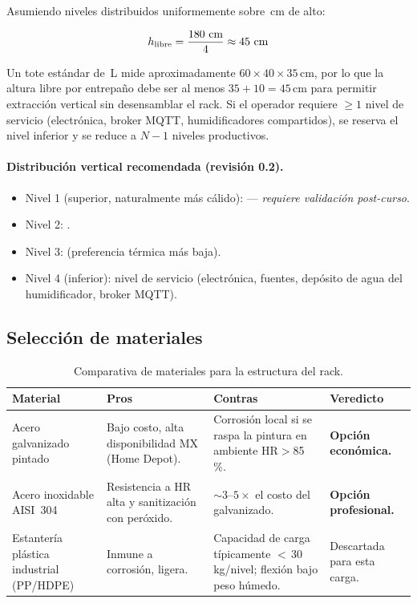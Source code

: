Asumiendo \paramNiveles{} niveles distribuidos uniformemente sobre
\paramHmax\,cm de alto:

\begin{equation}
  h_{\text{libre}} = \frac{\text{180}~\text{cm}}{\text{4}} \approx 45~\text{cm}
\end{equation}

Un tote estándar de \paramVolTote\,L mide aproximadamente
$60 \times 40 \times 35$\,cm, por lo que la altura libre por entrepaño
debe ser al menos $35 + 10 = 45$\,cm para permitir extracción vertical
sin desensamblar el rack. Si el operador requiere $\geq 1$ nivel de
servicio (electrónica, broker MQTT, humidificadores compartidos), se
reserva el nivel inferior y se reduce a $N - 1$ niveles productivos.

\paragraph{Distribución vertical recomendada (revisión 0.2).}
\begin{itemize}[leftmargin=*,itemsep=0pt]
  \item Nivel 1 (superior, naturalmente más cálido): \paramEspecieB{}
        --- \emph{requiere validación post-curso}.
  \item Nivel 2: \paramEspecieA{}.
  \item Nivel 3: \paramEspecieC{} (preferencia térmica más baja).
  \item Nivel 4 (inferior): nivel de servicio (electrónica, fuentes,
        depósito de agua del humidificador, broker MQTT).
\end{itemize}

\subsection{Selección de materiales}
\label{sec:rack:materiales}

\begin{table}[H]
  \centering
  \caption{Comparativa de materiales para la estructura del rack.}
  \label{tab:rack:materiales}
  \begin{tabularx}{\linewidth}{lXXX}
    \toprule
    \textbf{Material} & \textbf{Pros} & \textbf{Contras} & \textbf{Veredicto} \\
    \midrule
    Acero galvanizado pintado &
      Bajo costo, alta disponibilidad MX (Home Depot). &
      Corrosión local si se raspa la pintura en ambiente HR$>$85\,\%. &
      \textbf{Opción económica.} \\
    Acero inoxidable AISI~304 &
      Resistencia a HR alta y sanitización con peróxido. &
      $\sim 3$--$5\times$ el costo del galvanizado. &
      \textbf{Opción profesional.} \\
    Estantería plástica industrial (PP/HDPE) &
      Inmune a corrosión, ligera. &
      Capacidad de carga típicamente $<$\,30\,kg/nivel; flexión
      bajo peso húmedo. &
      Descartada para esta carga. \\
    \bottomrule
  \end{tabularx}
\end{table}

